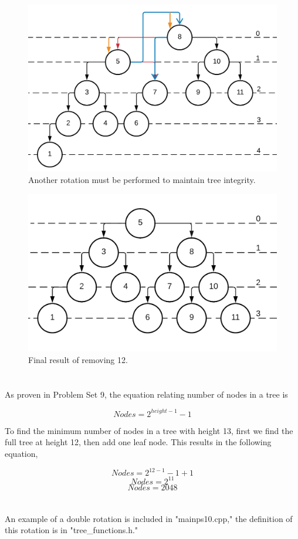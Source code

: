 \documentclass[journal]{IEEEtran}
\begin{document}
\begin{figure}[h!]
	\includegraphics[scale = 0.15]{avl23.png}
	\caption{Another rotation must be performed to maintain tree integrity.}
\end{figure}


\begin{figure}[h!]
	\includegraphics[scale = 0.18]{avl24.png}
	\caption{Final result of removing 12.}
\end{figure}

\section{}

As proven in Problem Set 9, the equation relating number of nodes in a tree is

\begin{equation}
	Nodes = 2^{height - 1}-1
\end{equation}

To find the minimum number of nodes in a tree with height 13, first we find the full tree at height 12, then add one leaf node.
This results in the following equation,

$$Nodes = 2^{12 - 1} - 1 + 1$$
$$Nodes = 2^{11}$$
$$Nodes = \boxed{2048}$$

\section{}

An example of a double rotation is included in "mainps10.cpp," the definition of this rotation is in "tree\_functions.h."
\end{document}
